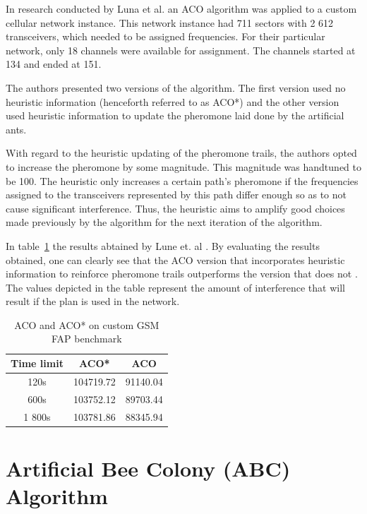 In research conducted by Luna et al.\cite{ACOvsEA} an \gls{ACO} algorithm was applied to a custom cellular network instance. This network instance had 711 sectors with 2 612 transceivers, which needed to be assigned frequencies. For their particular network, only 18 channels were available for assignment. The channels started at 134 and ended at 151\cite{ACOvsEA}.

The authors presented two versions of the algorithm. The first version used no heuristic information (henceforth referred to as \gls{ACO}*) and the other version used heuristic information to update the pheromone laid done by the artificial ants\cite{ACOvsEA}.

With regard to the heuristic updating of the pheromone trails, the authors opted to increase the pheromone by some magnitude\cite{ACOvsEA}. This magnitude was handtuned to be 100. The heuristic only increases a certain path's pheromone if the frequencies assigned to the transceivers represented by this path differ enough so as to not cause significant interference\cite{ACOvsEA}. Thus, the heuristic aims to amplify good choices made previously by the algorithm for the next iteration of the algorithm.

In table~\ref{tab:ACO} the results abtained by Lune et. al \cite{ACOvsEA}. By evaluating the results obtained, one can clearly see that the \gls{ACO} version that incorporates heuristic information to reinforce pheromone trails outperforms the version that does not \cite{ACOvsEA}. The values depicted in the table represent the amount of interference that will result if the plan is used in the network\cite{ACOvsEA}.
\begin{table}
\centering
	\begin{tabular}{| c | c | c |}
	\hline
	Time limit & \gls{ACO}* & \gls{ACO} \\ \hline
	120s & 104719.72 & 91140.04 \\ \hline
	600s & 103752.12 & 89703.44 \\ \hline
	1 800s & 103781.86 & 88345.94 \\ \hline
	\end{tabular}
\caption{ACO and \gls{ACO}* on custom GSM \gls{FAP} benchmark\cite{ACOvsEA}}
\label{tab:ACO}
\end{table}

\section{Artificial Bee Colony (ABC) Algorithm}
\label{sec:BEE}

